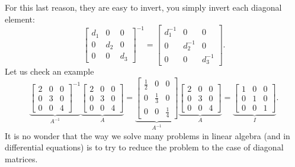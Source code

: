 \documentclass{ximera}
\begin{document}
For this last reason, they are easy to invert, you simply invert each diagonal element:
\begin{equation*}
    \begin{bmatrix}
        d_1 & 0 & 0 \\
        0 & d_2 & 0 \\
        0 & 0 & d_3 
    \end{bmatrix}^{-1}
    =
    \begin{bmatrix}
        d_1^{-1} & 0 & 0 \\
        0 & d_2^{-1} & 0 \\
        0 & 0 & d_3^{-1} 
    \end{bmatrix} .
\end{equation*}
Let us check an example
\begin{equation*}
    \underbrace{
    \begin{bmatrix}
        2 & 0 & 0 \\
        0 & 3 & 0 \\
        0 & 0 & 4 
    \end{bmatrix}^{-1}
    }_{A^{-1}} \underbrace{
    \begin{bmatrix}
        2 & 0 & 0 \\
        0 & 3 & 0 \\
        0 & 0 & 4 
    \end{bmatrix}
    }_{A} = \underbrace{
    \begin{bmatrix}
        \frac{1}{2} & 0 & 0 \\
        0 & \frac{1}{3} & 0 \\
        0 & 0 & \frac{1}{4} 
    \end{bmatrix}
    }_{A^{-1}} \underbrace{
    \begin{bmatrix}
        2 & 0 & 0 \\
        0 & 3 & 0 \\
        0 & 0 & 4 
    \end{bmatrix}
    }_{A} = \underbrace{
    \begin{bmatrix}
        1 & 0 & 0 \\
        0 & 1 & 0 \\
        0 & 0 & 1 
    \end{bmatrix}
    }_{I} .
\end{equation*}
It is no wonder that the way we solve many problems in linear algebra (and in differential equations) is to try to reduce the problem to the case of diagonal matrices.
\end{document}
